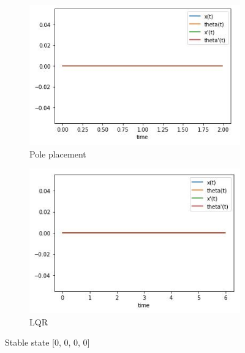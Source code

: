 \documentclass[12pt,letterpaper]{article}
\begin{document}
        
    \begin{figure}[htb]
        \begin{subfigure}{.5\textwidth}
            \centering
            \includegraphics[width=1\linewidth]{images/output/poles/0-0-0-0.jpg}
            \caption{Pole placement}
            \label{fig:pole_0}
        \end{subfigure}
        \begin{subfigure}{.5\textwidth}
          \centering
          \includegraphics[width=1\linewidth]{images/output/0-0-0-0.jpg}
          \caption{LQR}
        \label{fig:lqr_0}
        \end{subfigure}
    \caption{Stable state [0, 0, 0, 0]}
    \end{figure}
    
\end{document}

